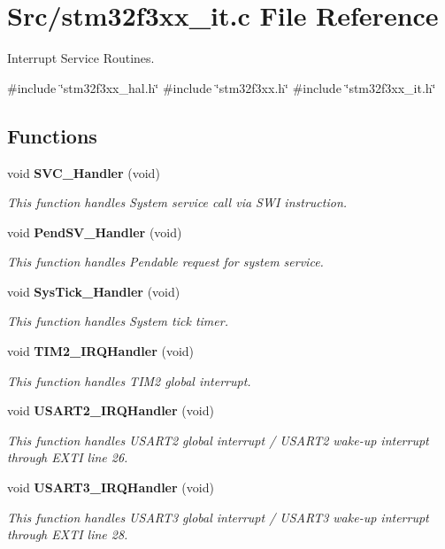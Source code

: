 \section{Src/stm32f3xx\+\_\+it.c File Reference}
\label{stm32f3xx__it_8c}


Interrupt Service Routines.  


{\ttfamily \#include \char`\"{}stm32f3xx\+\_\+hal.\+h\char`\"{}}\newline
{\ttfamily \#include \char`\"{}stm32f3xx.\+h\char`\"{}}\newline
{\ttfamily \#include \char`\"{}stm32f3xx\+\_\+it.\+h\char`\"{}}\newline
\subsection*{Functions}
\begin{DoxyCompactItemize}
\item 
void \textbf{ S\+V\+C\+\_\+\+Handler} (void)
\begin{DoxyCompactList}\small\item\em This function handles System service call via S\+WI instruction. \end{DoxyCompactList}\item 
void \textbf{ Pend\+S\+V\+\_\+\+Handler} (void)
\begin{DoxyCompactList}\small\item\em This function handles Pendable request for system service. \end{DoxyCompactList}\item 
void \textbf{ Sys\+Tick\+\_\+\+Handler} (void)
\begin{DoxyCompactList}\small\item\em This function handles System tick timer. \end{DoxyCompactList}\item 
void \textbf{ T\+I\+M2\+\_\+\+I\+R\+Q\+Handler} (void)
\begin{DoxyCompactList}\small\item\em This function handles T\+I\+M2 global interrupt. \end{DoxyCompactList}\item 
void \textbf{ U\+S\+A\+R\+T2\+\_\+\+I\+R\+Q\+Handler} (void)
\begin{DoxyCompactList}\small\item\em This function handles U\+S\+A\+R\+T2 global interrupt / U\+S\+A\+R\+T2 wake-\/up interrupt through E\+X\+TI line 26. \end{DoxyCompactList}\item 
void \textbf{ U\+S\+A\+R\+T3\+\_\+\+I\+R\+Q\+Handler} (void)
\begin{DoxyCompactList}\small\item\em This function handles U\+S\+A\+R\+T3 global interrupt / U\+S\+A\+R\+T3 wake-\/up interrupt through E\+X\+TI line 28. \end{DoxyCompactList}\end{DoxyCompactItemize}
